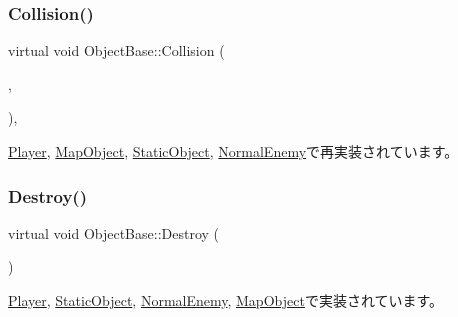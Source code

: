 \subsubsection{\texorpdfstring{Collision()}{Collision()}}
{\footnotesize\ttfamily virtual void Object\+Base\+::\+Collision (\begin{DoxyParamCaption}\item[{\mbox{\hyperlink{class_object_base}{Object\+Base}} $\ast$}]{,  }\item[{\mbox{\hyperlink{transform_8h_afb0c5e21d4133ff4f200992c0b534e1b}{V\+E\+C2}}}]{ }\end{DoxyParamCaption})\hspace{0.3cm}{\ttfamily [inline]}, {\ttfamily [virtual]}}



\mbox{\hyperlink{class_player_a184fbb2c70e34fb6c6a0c2fc7e0f86c9}{Player}}, \mbox{\hyperlink{class_map_object_a61c2b7e046b76d98adbf23c9e6302918}{Map\+Object}}, \mbox{\hyperlink{class_static_object_abe05f711f0d62319e1a11419813c5d50}{Static\+Object}}, \mbox{\hyperlink{class_normal_enemy_ac27e00973d2430da57e044bfe04fe5b4}{Normal\+Enemy}}で再実装されています。

\mbox{\label{class_object_base_a7fa4c548153c3af20f89673ffea809af}} 
\subsubsection{\texorpdfstring{Destroy()}{Destroy()}}
{\footnotesize\ttfamily virtual void Object\+Base\+::\+Destroy (\begin{DoxyParamCaption}{ }\end{DoxyParamCaption})\hspace{0.3cm}{\ttfamily [pure virtual]}}



\mbox{\hyperlink{class_player_af2cf4936165ef12cce96f7994e0879df}{Player}}, \mbox{\hyperlink{class_static_object_a8e9fb321b4f8f12c4bec1bc66853512f}{Static\+Object}}, \mbox{\hyperlink{class_normal_enemy_a8a4271b6da6c7679d134d1c08125815b}{Normal\+Enemy}}, \mbox{\hyperlink{class_map_object_ad4bcfdc33bd945a9aa5e50a57c2704bc}{Map\+Object}}で実装されています。

\mbox{\label{class_object_base_aea82aedc489b0a9d9990aafa06eef514}} 
